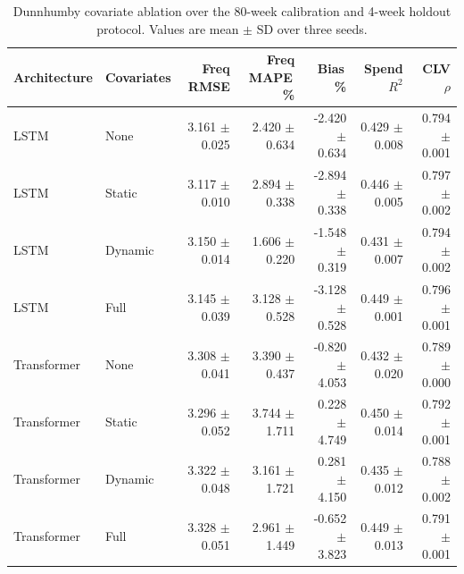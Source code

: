\begin{table}[htbp]
\centering
\small
\setlength{\tabcolsep}{4pt}
\caption{Dunnhumby covariate ablation over the 80-week calibration and 4-week holdout protocol. Values are mean $\pm$ SD over three seeds.}
\label{tab:covariate_ablation}
\begin{tabular}{llrrrrr}
\toprule
Architecture & Covariates & Freq RMSE & Freq MAPE\,\% & Bias\,\% & Spend $R^2$ & CLV $\rho$ \\
\midrule
LSTM & None & 3.161 $\pm$ 0.025 & 2.420 $\pm$ 0.634 & -2.420 $\pm$ 0.634 & 0.429 $\pm$ 0.008 & 0.794 $\pm$ 0.001 \\
LSTM & Static & 3.117 $\pm$ 0.010 & 2.894 $\pm$ 0.338 & -2.894 $\pm$ 0.338 & 0.446 $\pm$ 0.005 & 0.797 $\pm$ 0.002 \\
LSTM & Dynamic & 3.150 $\pm$ 0.014 & 1.606 $\pm$ 0.220 & -1.548 $\pm$ 0.319 & 0.431 $\pm$ 0.007 & 0.794 $\pm$ 0.002 \\
LSTM & Full & 3.145 $\pm$ 0.039 & 3.128 $\pm$ 0.528 & -3.128 $\pm$ 0.528 & 0.449 $\pm$ 0.001 & 0.796 $\pm$ 0.001 \\
\midrule
Transformer & None & 3.308 $\pm$ 0.041 & 3.390 $\pm$ 0.437 & -0.820 $\pm$ 4.053 & 0.432 $\pm$ 0.020 & 0.789 $\pm$ 0.000 \\
Transformer & Static & 3.296 $\pm$ 0.052 & 3.744 $\pm$ 1.711 & 0.228 $\pm$ 4.749 & 0.450 $\pm$ 0.014 & 0.792 $\pm$ 0.001 \\
Transformer & Dynamic & 3.322 $\pm$ 0.048 & 3.161 $\pm$ 1.721 & 0.281 $\pm$ 4.150 & 0.435 $\pm$ 0.012 & 0.788 $\pm$ 0.002 \\
Transformer & Full & 3.328 $\pm$ 0.051 & 2.961 $\pm$ 1.449 & -0.652 $\pm$ 3.823 & 0.449 $\pm$ 0.013 & 0.791 $\pm$ 0.001 \\
\bottomrule
\end{tabular}
\end{table}